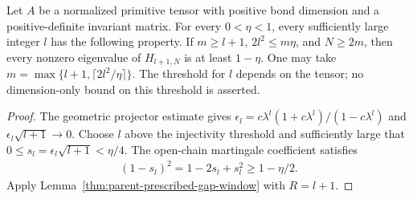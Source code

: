 \begin{lemma}
    \label{thm:primitive-parent-prescribed-gap}
    \leanok
    Let $A$ be a normalized primitive tensor with positive bond dimension
    and a positive-definite invariant matrix. For every $0<\eta<1$,
    every sufficiently large integer $l$ has the following property.
    If $m\ge l+1$, $2l^2\le m\eta$, and $N\ge2m$, then every nonzero
    eigenvalue of $H_{l+1,N}$ is at least $1-\eta$. One may take
    $m=\max\{l+1,\lceil2l^2/\eta\rceil\}$.
    The threshold for $l$ depends on the tensor; no dimension-only
    bound on this threshold is asserted.
\end{lemma}
\begin{proof}
    \leanok
    The geometric projector estimate gives
    $\epsilon_l=c\lambda^l(1+c\lambda^l)/(1-c\lambda^l)$ and
    $\epsilon_l\sqrt{l+1}\to0$. Choose $l$ above the injectivity
    threshold and sufficiently large that
    $0\le s_l=\epsilon_l\sqrt{l+1}<\eta/4$. The open-chain
    martingale coefficient satisfies
    \begin{align}
        (1-s_l)^2=1-2s_l+s_l^2\ge1-\eta/2.
    \end{align}
    Apply Lemma~\ref{thm:parent-prescribed-gap-window} with $R=l+1$.
\end{proof}

